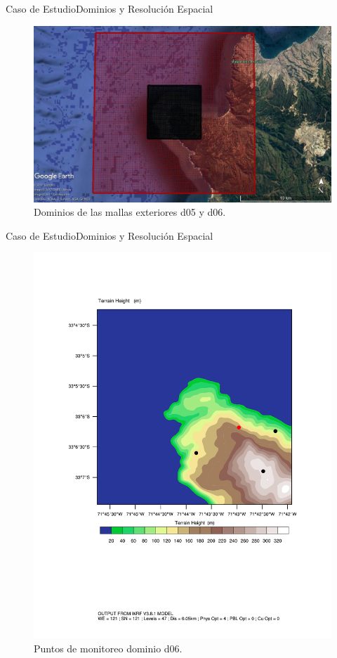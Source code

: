 \documentclass[mathserif]{beamer}
\begin{document}
\begin{frame}{Caso de Estudio}{Dominios y Resolución Espacial}
	\begin{figure}[H]
		\centering
		\includegraphics[width=0.95\linewidth]{d02d01}
		\caption{Dominios de las mallas exteriores d05 y d06.}
		\label{fig:0506}
	\end{figure}
\end{frame}

\begin{frame}{Caso de Estudio}{Dominios y Resolución Espacial}
	\vspace{4mm}
	\begin{figure}[H]
		\centering
		\includegraphics[width=0.75\linewidth,trim={1cm 6.5cm -1cm 4cm},clip]{altura}
		\vspace{-3mm}
		\caption{Puntos de monitoreo dominio d06.}
		\label{fig:monitor}
	\end{figure}
\end{frame}
\end{document}
